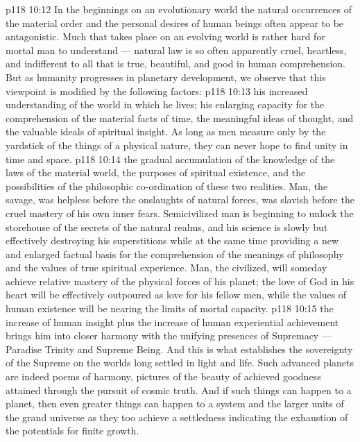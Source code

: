 \vs p118 10:12 \pc In the beginnings on an evolutionary world the natural occurrences of the material order and the personal desires of human beings often appear to be antagonistic. Much that takes place on an evolving world is rather hard for mortal man to understand --- natural law is so often apparently cruel, heartless, and indifferent to all that is true, beautiful, and good in human comprehension. But as humanity progresses in planetary development, we observe that this viewpoint is modified by the following factors:
\vs p118 10:13 \bibnobreakspace {} his increased understanding of the world in which he lives; his enlarging capacity for the comprehension of the material facts of time, the meaningful ideas of thought, and the valuable ideals of spiritual insight. As long as men measure only by the yardstick of the things of a physical nature, they can never hope to find unity in time and space.
\vs p118 10:14 \bibnobreakspace {} the gradual accumulation of the knowledge of the laws of the material world, the purposes of spiritual existence, and the possibilities of the philosophic co\hyp{}ordination of these two realities. Man, the savage, was helpless before the onslaughts of natural forces, was slavish before the cruel mastery of his own inner fears. Semicivilized man is beginning to unlock the storehouse of the secrets of the natural realms, and his science is slowly but effectively destroying his superstitions while at the same time providing a new and enlarged factual basis for the comprehension of the meanings of philosophy and the values of true spiritual experience. Man, the civilized, will someday achieve relative mastery of the physical forces of his planet; the love of God in his heart will be effectively outpoured as love for his fellow men, while the values of human existence will be nearing the limits of mortal capacity.
\vs p118 10:15 \bibnobreakspace {} the increase of human insight plus the increase of human experiential achievement brings him into closer harmony with the unifying presences of Supremacy --- Paradise Trinity and Supreme Being. And this is what establishes the sovereignty of the Supreme on the worlds long settled in light and life. Such advanced planets are indeed poems of harmony, pictures of the beauty of achieved goodness attained through the pursuit of cosmic truth. And if such things can happen to a planet, then even greater things can happen to a system and the larger units of the grand universe as they too achieve a settledness indicating the exhaustion of the potentials for finite growth.
